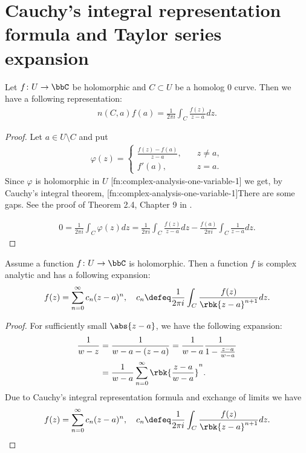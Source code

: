 \documentclass[openany, a4paper, oneside]{jsbook}
\begin{document}
\section{Cauchy's integral representation formula and Taylor series expansion}

\begin{thm}
 Let $f \colon U \to \bbC$ be holomorphic and $C \subset U$ be a homolog 0 curve.
 Then we have a following representation:
 \begin{align}
  n (C, a) f (a)
  =
  \frac{1}{2 \pi i} \int_C \frac{f (z)}{z - a} dz.
 \end{align}
\end{thm}
\begin{proof}
Let $a \in U \setminus C$ and put
\begin{align}
 \varphi (z)
 =
 \begin{cases}
  \frac{f (z) - f (a)}{z - a}, &\quad z \neq a, \\
  f'(a), &\quad z = a.
 \end{cases}
\end{align}
Since $\varphi$ is holomorphic in $U$ [fn:complex-analysis-one-variable-1]
we get, by Cauchy's integral theorem,
[fn:complex-analysis-one-variable-1]There are some gaps. See the proof of Theorem 2.4, Chapter 9 in \cite{MitsuoSugiura2}.

\begin{align}
 0
 =
 \frac{1}{2 \pi i} \int_C \varphi (z) dz
 =
 \frac{1}{2 \pi i} \int_C \frac{f (z)}{z-a} dz - \frac{f (a)}{2 \pi i} \int_C \frac{1}{z-a} dz.
\end{align}
\end{proof}
\begin{thm}
 Assume a function $f \colon U \to \bbC$ is holomorphic.
 Then a function $f$ is complex analytic and has a following expansion:
 \begin{align}
  f (z)
  =
  \sum_{n = 0}^{\infty} c_n (z-a)^n, \quad
  c_n \defeq \frac{1}{2 \pi i} \int_C \frac{f (z)}{\rbk{z - a}^{n+1}} dz.
 \end{align}
\end{thm}
\begin{proof}
 For sufficiently small $\abs{z-a}$, we have the following expansion:
 \begin{align}
  \frac{1}{w - z}
  &=
  \frac{1}{w - a - (z - a)} = \frac{1}{w - a} \frac{1}{1 - \frac{z - a}{w - a}} \\
  &=
  \frac{1}{w - a} \sum_{n=0}^{\infty} \rbk{\frac{z-a}{w - a}}^n.
 \end{align}
Due to Cauchy's integral representation formula and exchange of limits we have
\begin{align}
 f (z)
 =
 \sum_{n = 0}^{\infty} c_n (z-a)^n, \quad
 c_n \defeq \frac{1}{2 \pi i} \int_C \frac{f (z)}{\rbk{z - a}^{n+1}} dz.
\end{align}
\end{proof}
\end{document}

